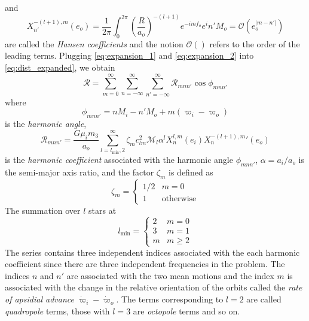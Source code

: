 and
\begin{equation}
    X^{-(l+1),m}_{n'}(e_o)= \frac{1}{2\pi} \int^{2\pi}_0 \left( \frac{R}{a_o}
    \right)^{-(l+1)}e^{-imf_o}e^in'M_o=\mathcal{O}(e_o^{\lvert m-n'\rvert})
\end{equation}
are called the \emph{Hansen coefficients} and the notion $\mathcal{O}()$
refers to the order of the leading terms. Plugging \cref{eq:expansion_1}
and \cref{eq:expansion_2} into \cref{eq:dist_expanded}, we obtain
\citep{Mardling2013}
\begin{equation}
    \mathcal{R}=\sum^\infty_{m=0}\sum^\infty_{n=-\infty}\sum^\infty_{n'=-\infty}
    \mathcal{R}_{mnn'}\cos\phi_{mnn'}
    \label{eq:disturbing_function}
\end{equation}
where 
\begin{equation}
    \phi_{mnn'}=nM_i-n'M_o+m(\varpi_i-\varpi_o)
\end{equation}
is the \emph{harmonic angle},
\begin{equation}
    \mathcal{R}_{mnn'}= \frac{G\mu_im_3}{a_o} \sum^\infty_{l=l_\text{min},2}
    \zeta_m c_{lm}^2\mathcal{M}_l\alpha^l X^{l,m}_n(e_i)X^{-(l+1),m}_n'(e_o)
    \label{eq:harmonic_coefficient}
\end{equation}
is the \emph{harmonic coefficient} associated with the harmonic angle
$\phi_{mnn'}$, $\alpha=a_i/a_o$ is the semi-major axis ratio, 
and the factor $\zeta_m$ is defined as
\begin{equation}
    \zeta_m=
    \begin{cases}
        1/2 & m=0\\
        1 & \text{otherwise}
    \end{cases}
\end{equation}
The summation over $l$ stars at
\begin{equation}
    l_\text{min}=
    \begin{cases}
        2 & m=0\\
        3 & m=1\\
        m & m\geq 2
    \end{cases}
\end{equation}
The series contains three independent indices associated with the each 
harmonic coefficient since there are three independent frequencies in the 
problem. The indices $n$ and $n'$ are associated with the  two mean 
motions and the index $m$ is associated with the change in the
relative orientation of the orbits called the 
\emph{rate of apsidial advance} $\dot{\varpi}_i-\dot{\varpi}_o$. 
The terms corresponding to $l=2$ are called \emph{quadropole} 
terms, those with $l=3$ are \emph{octopole} terms and so on.

